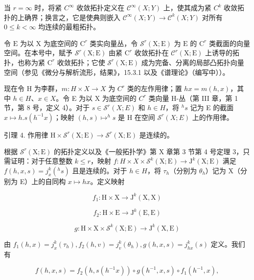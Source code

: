 当 \(r = \infty\) 时，将紧 \(C^{\infty}\) 收敛拓扑定义在 \(\mathcal{C}^{\infty}(X;Y)\) 上，使其成为紧 \(C^{k}\) 收敛拓扑的上确界；换言之，它是使典则嵌入 \(\mathcal{C}^{\infty}(X;Y) \to \mathcal{C}^{k}(X;Y)\) 对所有 \(0 \leq k < \infty\) 均连续的最粗拓扑。

令 \(\mathrm{E}\) 为以 \(\mathrm{X}\) 为底空间的 \(\mathrm{C}^r\) 类实向量丛，令 \(\mathcal{S}^r(\mathrm{X};\mathrm{E})\) 为 \(\mathrm{E}\) 的 \(\mathrm{C}^r\) 类截面的向量空间。在本号中，赋予 \(\mathcal{S}^r(\mathrm{X};\mathrm{E})\) 由紧 \(\mathrm{C}^r\) 收敛拓扑在 \(\mathcal{C}^r(\mathrm{X};\mathrm{E})\) 上诱导的拓扑，也称为紧 \(\mathrm{C}^r\) 收敛拓扑；它使 \(\mathcal{S}^r (\mathrm{X};\mathrm{E})\) 成为完备、分离的局部凸拓扑向量空间（参见《微分与解析流形，结果》，15.3.1 以及《谱理论》（编写中））。

现在令 H 为李群，\(m: H \times X \to X\) 为 \(C^{r}\) 类的左作用律；置 \(hx = m(h, x)\)，其中 \(h \in H\)、\(x \in X\)。令 E 为以 X 为底空间的 \(C^{r}\) 类向量 H-丛（第 III 章，第 1 节，第 8 号，定义 4）。对于 \(s \in \mathcal{S}^{r}(X; E)\) 和 \(h \in H\)，将 \(^{h}s\) 记为 E 的截面 \(x \mapsto h.s(h^{-1}x)\)；映射 \((h, s) \mapsto ^{h}s\) 是 H 在空间 \(\mathcal{S}^{r}(X; E)\) 上的作用律。

引理 4. 作用律 \(\mathrm{H} \times \mathcal{S}^r (\mathrm{X};\mathrm{E}) \to \mathcal{S}^r (\mathrm{X};\mathrm{E})\) 是连续的。

根据 \(\mathcal{S}^{r}(\mathrm{X};\mathrm{E})\) 的拓扑定义以及《一般拓扑学》第 X 章第 3 节第 4 号定理 3，只需证明：对于任意整数 \(k \leq r\)，映射 \(f : H \times X \times \mathcal{S}^{k}(\mathrm{X};\mathrm{E}) \to \mathrm{J}^{k}(\mathrm{X};\mathrm{E})\) 满足 \(f(h,x,s) = j_{x}^{k}(^{h}s)\) 且是连续的。对于 \(h \in H\)，将 \(\tau_{h}\)（分别为 \(\theta_{h}\)）记为 X（分别为 E）上的自同构 \(x \mapsto hx\)。定义映射

\[
f _ {1}: \mathrm{H} \times \mathrm{X} \to \mathrm{J} ^ {k} (\mathrm{X}, \mathrm{X})
\]

\[
f _ {2}: \mathrm{H} \times \mathrm{E} \rightarrow \mathrm{J} ^ {k} (\mathrm{E}, \mathrm{E})
\]

\[
g: \mathrm{H} \times \mathrm{X} \times \mathcal {S} ^ {k} (\mathrm{X}; \mathrm{E}) \to \mathrm{J} ^ {k} (\mathrm{X}, \mathrm{E})
\]

由 \(f_{1}(h,x) = j_{x}^{k}(\tau_{h}),f_{2}(h,v) = j_{v}^{k}(\theta_{h}),g(h,x,s) = j_{hx}^{k}(s)\) 定义。我们有

\[
f (h, x, s) = f _ {2} (h, s (h ^ {- 1} x)) \circ g (h ^ {- 1}, x, s) \circ f _ {1} (h ^ {- 1}, x),
\]

